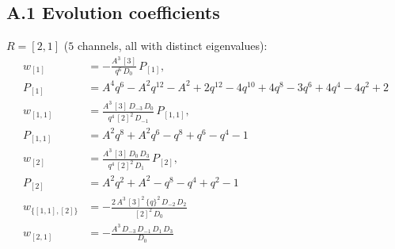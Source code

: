 \documentclass[11pt]{article}
\begin{document}
\subsection*{A.1 Evolution coefficients}
\noindent $R = [2,1]$ ($5$ channels, all with distinct eigenvalues):
\begin{align*}
w_{[1]} &= -\frac{A^{3}\,[3]}{q^{6}\,D_{0}}\,P_{[1]}, \\
 P_{[1]} &= A^{4}q^{6}-A^{2}q^{12}-A^{2}+2q^{12}-4q^{10}+4q^{8}-3q^{6}+4q^{4}-4q^{2}+2 \\
w_{[1,1]} &= \frac{A^{3}\,[3]\,D_{-3}\,D_{0}}{q^{4}\,[2]^{2}\,D_{-1}}\,P_{[1,1]}, \\
 P_{[1,1]} &= A^{2}q^{8}+A^{2}q^{6}-q^{8}+q^{6}-q^{4}-1 \\
w_{[2]} &= \frac{A^{3}\,[3]\,D_{0}\,D_{3}}{q^{4}\,[2]^{2}\,D_{1}}\,P_{[2]}, \\
 P_{[2]} &= A^{2}q^{2}+A^{2}-q^{8}-q^{4}+q^{2}-1 \\
w_{\{[1,1],[2]\}} &= -\frac{2\,A^{3}\,[3]^{2}\,\{q\}^{2}\,D_{-2}\,D_{2}}{[2]^{2}\,D_{0}} \\
w_{[2,1]} &= -\frac{A^{3}\,D_{-3}\,D_{-1}\,D_{1}\,D_{3}}{D_{0}} \\
\end{align*}
\end{document}
